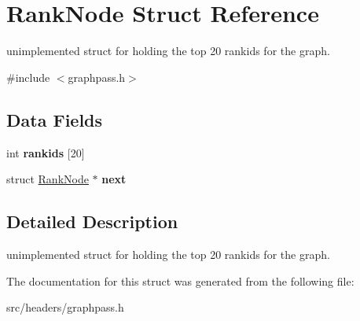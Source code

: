 \hypertarget{struct_rank_node}{}\section{Rank\+Node Struct Reference}
\label{struct_rank_node}


unimplemented struct for holding the top 20 rankids for the graph.  




{\ttfamily \#include $<$graphpass.\+h$>$}

\subsection*{Data Fields}
\begin{DoxyCompactItemize}
\item 
\mbox{\label{struct_rank_node_ace2aba3cae9ab3c83c32aae0ab75e8d7}} 
int {\bfseries rankids} \mbox{[}20\mbox{]}
\item 
\mbox{\label{struct_rank_node_a236b0a38592ebd2115bd73eca8d13ba9}} 
struct \hyperlink{struct_rank_node}{Rank\+Node} $\ast$ {\bfseries next}
\end{DoxyCompactItemize}


\subsection{Detailed Description}
unimplemented struct for holding the top 20 rankids for the graph. 

The documentation for this struct was generated from the following file\+:\begin{DoxyCompactItemize}
\item 
src/headers/graphpass.\+h\end{DoxyCompactItemize}
